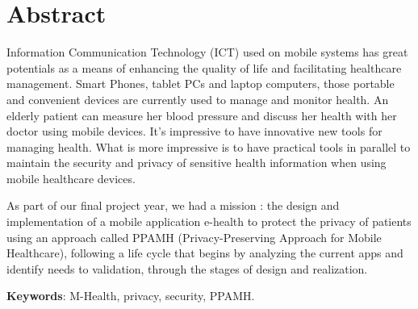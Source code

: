 
\chapter*{Abstract}

Information Communication Technology (ICT) used on mobile systems has great potentials as a means of enhancing the quality of life and facilitating healthcare management. Smart Phones, tablet PCs and laptop computers, those portable and convenient devices are currently used to manage and monitor health. An elderly patient can measure her blood pressure and discuss her health with her doctor using mobile devices.
It’s impressive to have innovative new tools for managing health. What is more impressive is to have practical tools in parallel to maintain the security and privacy of sensitive health information when using mobile healthcare devices.

\vspace{6pt}
\paragraphmark

As part of our final project year, we had a mission : the design and implementation of a mobile application e-health to protect the privacy of patients using an approach called PPAMH (Privacy-Preserving Approach for Mobile Healthcare), following a life cycle that begins by analyzing the current apps and identify needs to validation, through the stages of design and realization.

\vspace{35pt}
\paragraphmark

\textbf{Keywords}: M-Health, privacy, security, PPAMH.